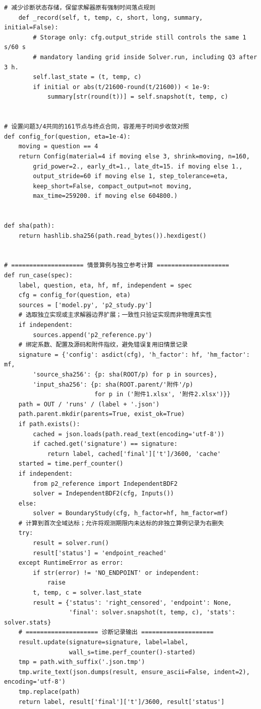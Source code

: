 \begin{Verbatim}[fontsize=\scriptsize,breaklines=true,breakanywhere=true]
    # 减少诊断状态存储，保留求解器原有强制时间落点规则
    def _record(self, t, temp, c, short, long, summary, initial=False):
        # Storage only: cfg.output_stride still controls the same 1 s/60 s
        # mandatory landing grid inside Solver.run, including Q3 after 3 h.
        self.last_state = (t, temp, c)
        if initial or abs(t/21600-round(t/21600)) < 1e-9:
            summary[str(round(t))] = self.snapshot(t, temp, c)


# 设置问题3/4共同的161节点与终点合同，容差用于时间步收敛对照
def config_for(question, eta=1e-4):
    moving = question == 4
    return Config(material=4 if moving else 3, shrink=moving, n=160,
        grid_power=2., early_dt=1., late_dt=15. if moving else 1.,
        output_stride=60 if moving else 1, step_tolerance=eta,
        keep_short=False, compact_output=not moving,
        max_time=259200. if moving else 604800.)


def sha(path):
    return hashlib.sha256(path.read_bytes()).hexdigest()


# ==================== 情景算例与独立参考计算 ====================
def run_case(spec):
    label, question, eta, hf, mf, independent = spec
    cfg = config_for(question, eta)
    sources = ['model.py', 'p2_study.py']
    # 选取独立实现或主求解器边界扩展；一致性只验证实现而非物理真实性
    if independent:
        sources.append('p2_reference.py')
    # 绑定系数、配置及源码和附件指纹，避免错误复用旧情景记录
    signature = {'config': asdict(cfg), 'h_factor': hf, 'hm_factor': mf,
        'source_sha256': {p: sha(ROOT/p) for p in sources},
        'input_sha256': {p: sha(ROOT.parent/'附件'/p)
                         for p in ('附件1.xlsx', '附件2.xlsx')}}
    path = OUT / 'runs' / (label + '.json')
    path.parent.mkdir(parents=True, exist_ok=True)
    if path.exists():
        cached = json.loads(path.read_text(encoding='utf-8'))
        if cached.get('signature') == signature:
            return label, cached['final']['t']/3600, 'cache'
    started = time.perf_counter()
    if independent:
        from p2_reference import IndependentBDF2
        solver = IndependentBDF2(cfg, Inputs())
    else:
        solver = BoundaryStudy(cfg, h_factor=hf, hm_factor=mf)
    # 计算到首次全域达标；允许将观测期限内未达标的非独立算例记录为右删失
    try:
        result = solver.run()
        result['status'] = 'endpoint_reached'
    except RuntimeError as error:
        if str(error) != 'NO_ENDPOINT' or independent:
            raise
        t, temp, c = solver.last_state
        result = {'status': 'right_censored', 'endpoint': None,
                  'final': solver.snapshot(t, temp, c), 'stats': solver.stats}
    # ==================== 诊断记录输出 ====================
    result.update(signature=signature, label=label,
                  wall_s=time.perf_counter()-started)
    tmp = path.with_suffix('.json.tmp')
    tmp.write_text(json.dumps(result, ensure_ascii=False, indent=2), encoding='utf-8')
    tmp.replace(path)
    return label, result['final']['t']/3600, result['status']



\end{Verbatim}
